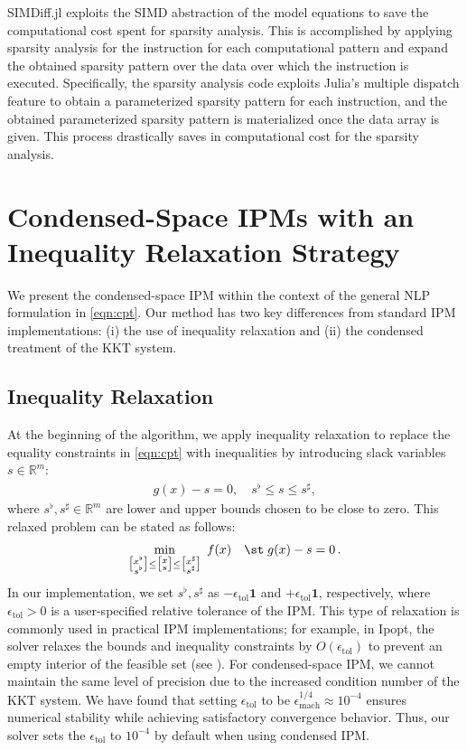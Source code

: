 SIMDiff.jl exploits the SIMD abstraction of the model equations to
save the computational cost spent for sparsity analysis.  This is
accomplished by applying sparsity analysis for the instruction for
each computational pattern and expand the obtained sparsity pattern
over the data over which the instruction is executed. Specifically,
the sparsity analysis code exploits Julia's multiple dispatch feature
to obtain a parameterized sparsity pattern for each instruction, and the
obtained parameterized sparsity pattern is materialized once the data
array is given. This process drastically saves in computational cost
for the sparsity analysis.

\section{Condensed-Space IPMs with an Inequality Relaxation Strategy}\label{sec:ipm}
We present the condensed-space IPM within the
context of the general NLP formulation in \eqref{eqn:cpt}. Our method
has two key differences from standard IPM
implementations: (i) the use of inequality relaxation and (ii) the
condensed treatment of the KKT system.

\subsection{Inequality Relaxation}

At the beginning of the algorithm, we apply inequality relaxation to replace the equality constraints in \eqref{eqn:cpt} with inequalities by introducing slack variables $s\in\mathbb{R}^{m}$:
\begin{align}\label{eqn:relax}
  g(x)- s = 0,\quad s^{\flat}\leq s\leq  s^\sharp,
\end{align}
where $s^\flat,s^\sharp\in\mathbb{R}^{m}$ are lower and upper bounds chosen to be close to zero.
This relaxed problem can be stated as follows:
\begin{equation}\label{eqn:relaxed}
    \min_{\big[\substack{x^\flat\\s^\flat}\big]\leq \big[\substack{x\\s}\big] \leq \big[\substack{x^\sharp\\s^\sharp}\big]}\;
      f(x)\quad \st\;  g(x) - s = 0 \, .
\end{equation}
In our implementation, we set $s^{\flat},s^\sharp$ as
$-\epsilon_{\text{tol}}\boldsymbol{1}$ and $+\epsilon_{\text{tol}}\boldsymbol{1}$, respectively,
where $\epsilon_{\text{tol}}>0$ is a user-specified relative tolerance
of the IPM. This type of relaxation is
commonly used in practical IPM implementations; for example, in Ipopt,
the solver relaxes the bounds and inequality constraints by
$O(\epsilon_{\text{tol}})$ to prevent an empty interior of the
feasible set (see \cite[Section 3.5]{wachter2006implementation}).
For condensed-space IPM, we cannot maintain the same level of precision
due to the increased condition number of the KKT system.
We have found that setting $\epsilon_{\text{tol}}$ to be
$\epsilon_{\text{mach}}^{1/4}\approx 10^{-4}$ ensures numerical
stability while achieving satisfactory convergence behavior. Thus, our
solver sets the $\epsilon_\text{tol}$ to $10^{-4}$ by default when using condensed
IPM.

